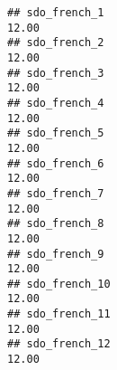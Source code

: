 \documentclass[
]{article}
\begin{document}
\begin{verbatim}
## sdo_french_1                                                                                                                                                                                                                  12.00
## sdo_french_2                                                                                                                                                                                                                  12.00
## sdo_french_3                                                                                                                                                                                                                  12.00
## sdo_french_4                                                                                                                                                                                                                  12.00
## sdo_french_5                                                                                                                                                                                                                  12.00
## sdo_french_6                                                                                                                                                                                                                  12.00
## sdo_french_7                                                                                                                                                                                                                  12.00
## sdo_french_8                                                                                                                                                                                                                  12.00
## sdo_french_9                                                                                                                                                                                                                  12.00
## sdo_french_10                                                                                                                                                                                                                 12.00
## sdo_french_11                                                                                                                                                                                                                 12.00
## sdo_french_12                                                                                                                                                                                                                 12.00

\end{verbatim}
\end{document}
